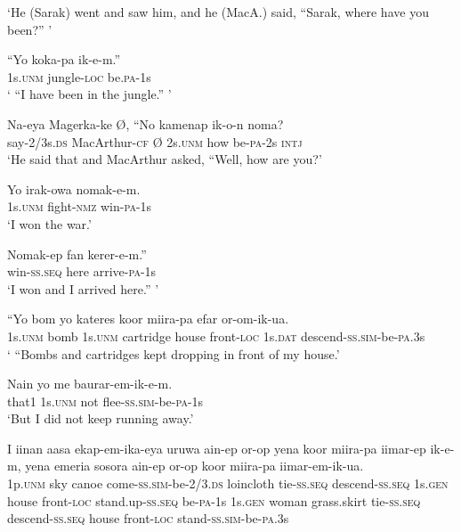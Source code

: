 \glt ‘He (Sarak) went and saw him, and he (MacA.) said, “Sarak, where have you been?” ’ \\
\z


\ea\label{ex:a:x109}
\gll  “Yo  koka-pa  ik-e-m.” \\
1s.\textsc{unm}  jungle-\textsc{loc}  be.\textsc{pa}-1s \\
\glt ‘ “I have been in the jungle.” ’ \\
\z


\ea\label{ex:a:x110}
\gll  Na-eya  Magerka-ke  Ø,  ``No  kamenap  ik-o-n  noma? \\
say-2/3s.\textsc{ds}  MacArthur-\textsc{cf}  Ø  2s.\textsc{unm}  how  be-\textsc{pa}-2s  \textsc{intj} \\
\glt ‘He said that and MacArthur asked, “Well, how are you?’ \\
\z


\ea\label{ex:a:x111}
\gll  Yo  irak-owa  nomak-e-m. \\
1s.\textsc{unm}  fight-\textsc{nmz}  win-\textsc{pa}-1s \\
\glt ‘I won the war.’ \\
\z


\ea\label{ex:a:x112}
\gll  Nomak-ep  fan  kerer-e-m.” \\
win-\textsc{ss.seq}  here  arrive-\textsc{pa}-1s \\
\glt ‘I won and I arrived here.” ’ \\
\z


\ea\label{ex:a:x113}
\gll  “Yo  bom  yo  kateres  koor  miira-pa  efar           or-om-ik-ua. \\
1s.\textsc{unm}  bomb  1s.\textsc{unm}  cartridge  house  front-\textsc{loc}  1s.\textsc{dat}   descend-\textsc{ss}.\textsc{sim}-be-\textsc{pa}.3s \\


\glt ‘ “Bombs and cartridges kept dropping in front of my house.’ \\
\z


\ea\label{ex:a:x114}
\gll  Nain  yo  me  baurar-em-ik-e-m. \\
that1  1s.\textsc{unm}  not  flee-\textsc{ss}.\textsc{sim}-be-\textsc{pa}-1s \\
\glt ‘But I did not keep running away.’ \\
\z


\ea\label{ex:a:x115}
\gll  I  iinan  aasa  ekap-em-ika-eya  uruwa  ain-ep             or-op  yena  koor  miira-pa  iimar-ep                     ik-e-m,  yena  emeria  sosora  ain-ep  or-op                        koor  miira-pa  iimar-em-ik-ua. \\
1p.\textsc{unm}  sky  canoe  come-\textsc{ss}.\textsc{sim}-be-2/3.\textsc{ds}  loincloth  tie-\textsc{ss.seq} descend-\textsc{ss.seq}  1s.\textsc{gen}  house  front-\textsc{loc}  stand.up-\textsc{ss.seq} be-\textsc{pa}-1s  1s.\textsc{gen}  woman  grass.skirt  tie-\textsc{ss.seq}  descend-\textsc{ss.seq}    house  front-\textsc{loc}  stand-\textsc{ss}.\textsc{sim}-be-\textsc{pa}.3s \\







